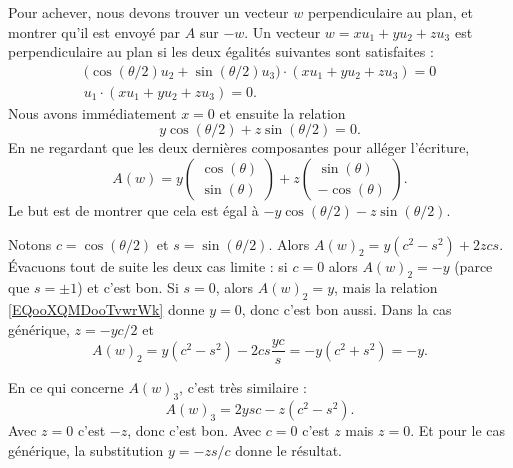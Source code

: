 \begin{subproof}
        Pour achever, nous devons trouver un vecteur \( w\) perpendiculaire au plan, et montrer qu'il est envoyé par \( A\) sur \( -w\). Un vecteur \( w=xu_1+yu_2+zu_3\) est perpendiculaire au plan si les deux égalités suivantes sont satisfaites :
        \begin{subequations}
            \begin{align}
                \big( \cos(\theta/2)u_2+\sin(\theta/2)u_3 \big)\cdot (xu_1+yu_2+zu_3)=0\\
                u_1\cdot(xu_1+yu_2+zu_3)=0.
            \end{align}
        \end{subequations}
        Nous avons immédiatement \( x=0\) et ensuite la relation
        \begin{equation}        \label{EQooXQMDooTvwrWk}
            y\cos(\theta/2)+z\sin(\theta/2)=0.
        \end{equation}
        En ne regardant que les deux dernières composantes pour alléger l'écriture,
        \begin{equation}
            A(w)=y\begin{pmatrix}
                \cos(\theta)    \\
                \sin(\theta)
            \end{pmatrix}+z\begin{pmatrix}
                \sin(\theta)    \\
                -\cos(\theta)
            \end{pmatrix}.
        \end{equation}
        Le but est de montrer que cela est égal à \( -y\cos(\theta/2)-z\sin(\theta/2)\).

        Notons \( c=\cos(\theta/2)\) et \( s=\sin(\theta/2)\). Alors \( A(w)_2=y(c^2-s^2)+2zcs\). Évacuons tout de suite les deux cas limite : si \( c=0\) alors \( A(w)_2=-y\) (parce que \( s=\pm1\)) et c'est bon. Si \( s=0\), alors \( A(w)_2=y\), mais la relation \eqref{EQooXQMDooTvwrWk} donne \( y=0\), donc c'est bon aussi. Dans la cas générique, \( z=-yc/2\) et
        \begin{equation}
            A(w)_2=y(c^2-s^2)-2cs\frac{ yc }{ s }=-y(c^2+s^2)=-y.
        \end{equation}

        En ce qui concerne \( A(w)_3\), c'est très similaire :
        \begin{equation}
            A(w)_3=2ysc-z(c^2-s^2).
        \end{equation}
        Avec \( z=0\) c'est \( -z\), donc c'est bon. Avec \( c=0\) c'est \( z\) mais \( z=0\). Et pour le cas générique, la substitution \( y=-zs/c\) donne le résultat.



\end{subproof}
